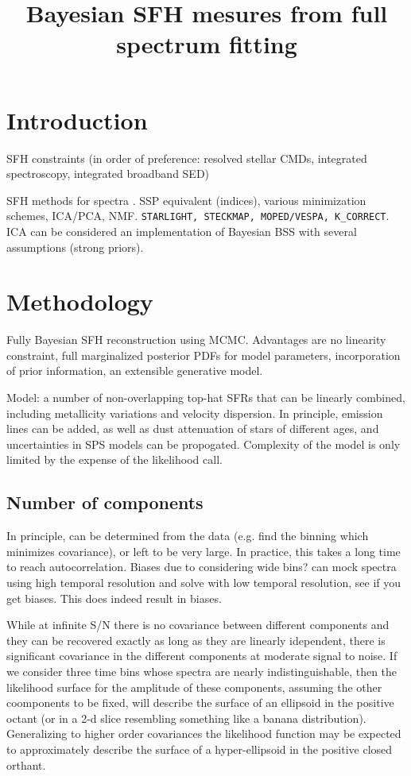 \title{Bayesian SFH mesures from full spectrum fitting}


\section{Introduction}
\citet{tinsley68}

SFH constraints (in order of preference: resolved stellar CMDs, integrated spectroscopy, integrated broadband SED)

SFH methods for spectra \citep{walcher2011}.  SSP equivalent (indices), various minimization schemes, ICA/PCA, NMF. \texttt{STARLIGHT, STECKMAP, MOPED/VESPA, K_CORRECT}.  ICA can be considered an implementation of Bayesian BSS with several assumptions (strong priors).

\section{Methodology}
Fully Bayesian SFH reconstruction using MCMC.  Advantages are no linearity constraint, full marginalized posterior PDFs for model parameters, incorporation of prior information, an extensible generative model.

Model:  a number of non-overlapping top-hat SFRs that can be linearly combined, including metallicity variations and velocity dispersion.  In principle, emission lines can be added, as well as dust attenuation of stars of different ages, and uncertainties in SPS models can be propogated.  Complexity of the model is only limited by the expense of the likelihood call.

\subsection{Number of components}
In principle, can be determined from the data (e.g. find the binning which minimizes covariance), or left to be very large.  In practice, this takes a long time to reach autocorrelation. Biases due to considering wide bins?  can mock spectra using high temporal resolution and solve with low temporal resolution, see if you get biases.  This does indeed result in biases.

While at infinite S/N there is no covariance between different components and they can be recovered exactly as long as they are linearly idependent, there is significant covariance in the different components at moderate signal to noise.  If we consider three time bins whose spectra are nearly indistinguishable, then the likelihood surface for the amplitude of these components, assuming the other coomponents to be fixed, will describe the surface of an ellipsoid in the positive octant (or in a 2-d slice resembling something like a banana distribution).  Generalizing to higher order covariances the likelihood function may be expected to approximately describe the surface of a hyper-ellipsoid in the positive closed orthant.

